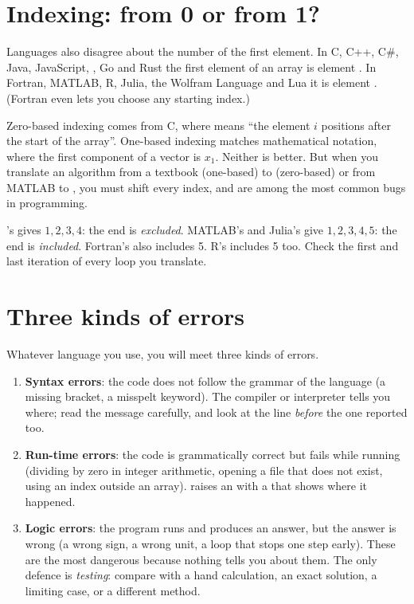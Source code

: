 \section{Indexing: from 0 or from 1?}

Languages also disagree about the number of the first element. In C, C++, C\#, Java,
JavaScript, \py, Go and Rust the first element of an array is element . In
Fortran, MATLAB, R, Julia, the Wolfram Language and Lua it is element . (Fortran
even lets you choose any starting index.)

Zero-based indexing comes from C, where  means ``the element $i$ positions
after the start of the array''. One-based indexing matches mathematical notation, where
the first component of a vector is $x_1$. Neither is better. But when you translate an
algorithm from a textbook (one-based) to \py (zero-based) or from MATLAB to \py, you must
shift every index, and  are among the most common bugs in
programming.

\begin{pitfall}
\py's  gives $1, 2, 3, 4$: the end is \emph{excluded}. MATLAB's
 and Julia's  give $1, 2, 3, 4, 5$: the end is \emph{included}.
Fortran's  also includes 5. R's  includes 5 too. Check the
first and last iteration of every loop you translate.
\end{pitfall}

\section{Three kinds of errors}

Whatever language you use, you will meet three kinds of errors.
\begin{enumerate}
\item \textbf{Syntax errors}: the code does not follow the grammar of the language
  (a missing bracket, a misspelt keyword). The compiler or interpreter tells you where;
  read the message carefully, and look at the line \emph{before} the one reported too.
\item \textbf{Run-time errors}: the code is grammatically correct but fails while
  running (dividing by zero in integer arithmetic, opening a file that does not exist,
  using an index outside an array). \py raises an  with a
   that shows where it happened.
\item \textbf{Logic errors}: the program runs and produces an answer, but the answer is
  wrong (a wrong sign, a wrong unit, a loop that stops one step early). These are the most
  dangerous because nothing tells you about them. The only defence is \emph{testing}:
  compare with a hand calculation, an exact solution, a limiting case, or a different
  method.
\end{enumerate}

